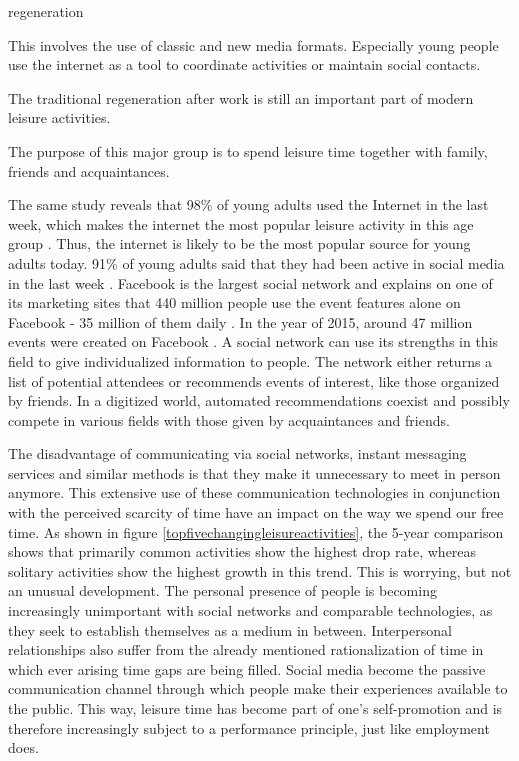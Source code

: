 \documentclass[12pt,numbers=noenddot,parskip,bibliography=totocnumbered,listof=totocnumbered]{scrreprt}
\begin{document}
\begin{labeling}{regeneration}
\item[media use] This involves the use of classic and new media formats. Especially young people use the internet as a tool to coordinate activities or maintain social contacts.
\item[regeneration] The traditional regeneration after work is still an important part of modern leisure activities.
\item[socialize] The purpose of this major group is to spend leisure time together with family, friends and acquaintances.
\end{labeling}

The same study reveals that 98\% of young adults used the Internet in the last week, which makes the internet the most popular leisure activity in this age group \cite{freizeitmonitor2016}. Thus, the internet is likely to be the most popular source for young adults today. 91\% of young adults said that they had been active in social media in the last week \cite{freizeitmonitor2016}. Facebook is the largest social network and explains on one of its marketing sites that 440 million people use the event features alone on Facebook - 35 million of them daily \citep{facebook2017}. In the year of 2015, around 47 million events were created on Facebook \citep{facebook2017}. A social network can use its strengths in this field to give individualized information to people. The network either returns a list of potential attendees or recommends events of interest, like those organized by friends. In a digitized world, automated recommendations coexist and possibly compete in various fields with those given by acquaintances and friends.

The disadvantage of communicating via social networks, instant messaging services and similar methods is that they make it unnecessary to meet in person anymore. This extensive use of these communication technologies in conjunction with the perceived scarcity of time have an impact on the way we spend our free time. As shown in figure \ref{topfivechangingleisureactivities}, the 5-year comparison shows that primarily common activities show the highest drop rate, whereas solitary activities show the highest growth in this trend. This is worrying, but not an unusual development. The personal presence of people is becoming increasingly unimportant with social networks and comparable technologies, as they seek to establish themselves as a medium in between. Interpersonal relationships also suffer from the already mentioned rationalization of time in which ever arising time gaps are being filled. Social media become the passive communication channel through which people make their experiences available to the public. This way, leisure time has become part of one's self-promotion and is therefore increasingly subject to a performance principle, just like employment does.
\end{document}

